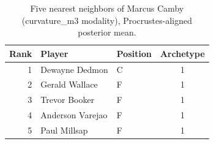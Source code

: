 \begin{table}[htbp]
  \centering\small
  \begin{tabular}{rllc}
    \toprule
    Rank & Player & Position & Archetype \\
    \midrule
    1 & Dewayne Dedmon & C & 1 \\
    2 & Gerald Wallace & F & 1 \\
    3 & Trevor Booker & F & 1 \\
    4 & Anderson Varejao & F & 1 \\
    5 & Paul Millsap & F & 1 \\
    \bottomrule
  \end{tabular}
  \caption{Five nearest neighbors of Marcus Camby (curvature_m3 modality), Procrustes-aligned posterior mean.}
  \label{tab:Marcus_Camby_neighbors_curvature_m3}
\end{table}

